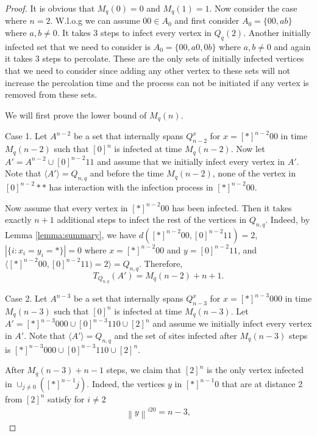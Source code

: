 \documentclass[10pt,a4paper]{amsart}
\begin{document}
\begin{proof}
It is obvious that $M_{q}(0)=0$ and $M_q(1)=1$. Now consider the case where $n=2$. W.l.o.g we can assume $00 \in A_0$ and first consider $A_0=\{00,ab\}$ where $a, b\neq 0$. It takes 3 steps to infect every vertex in $Q_q(2)$. Another initially infected set that we need to consider is $A_{0}=\{00,a0,0b\}$ where $a,b \neq 0$ and again it takes 3 steps to percolate. These are the only sets of initially infected vertices that we need to consider since adding any other vertex to these sets will not increase the percolation time and the process can not be initiated if any vertex is removed from these sets. 

We will first prove the lower bound of $M_{q}(n)$. 

Case 1. Let $A^{n-2}$ be a set that internally spans $Q^x_{n-2}$ for $x=[\ast]^{n-2}00$ in time $M_q(n-2)$ such that $[0]^n$ is infected at time $M_q(n-2)$. Now let $A'=A^{n-2} \cup [0]^{n-2}11$ and assume that we initially infect every vertex in $A'$. Note that $\langle A' \rangle=Q_{n,q}$ and before the time $M_q(n-2)$, none of the vertex in $[0]^{n-2}\ast \ast$ has interaction with the infection process in $[\ast]^{n-2}00$. 

Now assume that every vertex in $[\ast]^{n-2}00$ has been infected. Then it takes exactly $n+1$ additional steps to infect the rest of the vertices in $Q_{n,q}$. Indeed, by Lemma \ref{lemma:summary}, we have $d([\ast]^{n-2}00, [0]^{n-2}11)=2$, $|\{i:x_i=y_i=\ast\}|=0$ where $x=[\ast]^{n-2}00$ and $y=[0]^{n-2}11$, and $\langle [\ast]^{n-2}00, [0]^{n-2}11)=2\rangle= Q_{n,q}$. Therefore, 
$$T_{Q_{n,q}}(A')=M_q(n-2)+n+1.$$

Case 2. Let $A^{n-3}$ be a set that internally spans $Q_{n-3}^x$ for $x=[\ast]^{n-3}000$ in time $M_q(n-3)$ such that $[0]^n$ is infected at time $M_q(n-3)$. Let $A'=[\ast]^{n-3}000 \cup [0]^{n-3}110 \cup [2]^n$ and assume we initially infect every vertex in $A'$. Note that 
$\langle A' \rangle=Q_{n,q}$ and the set of sites infected after $M_q(n-3)$ steps is $[\ast]^{n-3}000 \cup [0]^{n-3}110 \cup [2]^n$.

After $M_q(n-3)+n-1$ steps, we claim that $[2]^n$ is the only vertex infected in $\cup_{j \neq 0} ([\ast]^{n-1}j)$. Indeed, the vertices $y$ in $[\ast]^{n-1}0$ that are at distance 2 from $[2]^n$ satisfy for $i \neq 2$ 
\begin{align} \label{eq:j20}
\left \lVert y \right \rVert^{i20}= n-3,  
\end{align} 


\end{proof}
\end{document}
